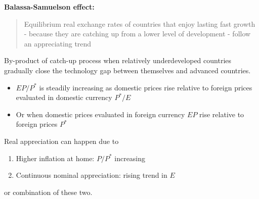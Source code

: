 \documentclass{beamer}
\begin{document}
\begin{frame}
  \textbf{Balassa-Samuelson effect:}
  \begin{quote}
    Equilibrium real exchange rates of countries that enjoy lasting fast growth - because they are catching up from a lower level of development - follow an appreciating trend
  \end{quote}
  By-product of catch-up process when relatively underdeveloped countries gradually close the technology gap between themselves and advanced countries.
  \begin{itemize}
    \item $EP/P^*$ is steadily increasing as domestic prices rise relative to foreign prices evaluated in domestic currency $P^* / E$
    \item Or when domestic prices evaluated in foreign currency $EP$ rise relative to foreign prices $P^*$
  \end{itemize}
  Real appreciation can happen due to
  \begin{enumerate}
    \item Higher inflation at home: $P / P^*$ increasing
    \item Continuous nominal appreciation: rising trend in $E$
  \end{enumerate}
  or combination of these two.
\end{frame}


\end{document}
